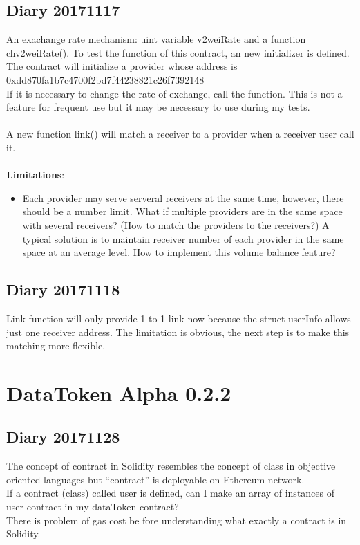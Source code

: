 \subsection{Diary 20171117}
An exachange rate mechanism: uint variable v2weiRate and a function chv2weiRate().
To test the function of this contract, an new initializer is defined.
The contract will initialize a provider whose address is\\
0xdd870fa1b7c4700f2bd7f44238821c26f7392148\\

If it is necessary to change the rate of exchange, call the function. This is not 
a feature for frequent use but it may be necessary to use during my tests.\\\\
A new function link() will match a receiver to a provider when a receiver user call it.\\\\
\textbf{Limitations}:
\begin{itemize}
    \item Each provider may serve serveral receivers at the same time, however,
    there should be a number limit. What if multiple providers are in the same space with
    several receivers? (How to match the providers to the receivers?)
    A typical solution is to maintain receiver number of each provider in the same space
    at an average level. How to implement this volume balance feature?
\end{itemize}
\subsection{Diary 20171118}
Link function will only provide 1 to 1 link now because the struct userInfo allows just one receiver address.
The limitation is obvious, the next step is to make this matching more flexible.
\section{DataToken Alpha 0.2.2}
\subsection{Diary 20171128}
The concept of contract in Solidity resembles the concept of class in objective oriented languages
but ``contract'' is deployable on Ethereum network.\\
If a contract (class) called user is defined, can I make an array of instances of user contract in my dataToken contract?\\
There is problem of gas cost be
fore understanding what exactly a contract is in Solidity.
